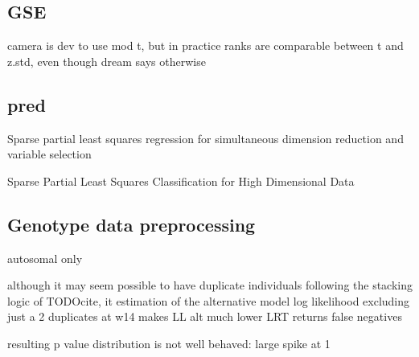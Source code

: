 \begin{outline}
\subsection{GSE}

camera is dev to use mod t, but in practice ranks are comparable between t and z.std, even though dream says otherwise

\subsection{pred}

Sparse partial least squares regression for simultaneous dimension reduction and variable selection

 Sparse Partial Least Squares Classification for High Dimensional Data 

\subsection{Genotype data preprocessing}

%
%
%
%

autosomal only

although it may seem possible to have duplicate individuals
    following the stacking logic of TODOcite, 
    it estimation of the alternative model log likelihood
    excluding just a 2 duplicates at w14
    makes LL alt much lower
    LRT returns false negatives

    resulting p value distribution is not well behaved:
    large spike at 1


\end{outline}
